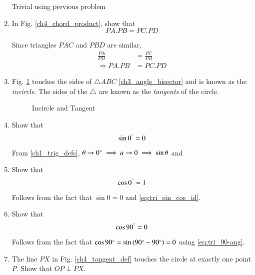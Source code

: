 \begin{enumerate}[label=\arabic*.,ref=\thesubsection.\theenumi]
\solution Trivial using previous problem
\item
	In Fig. \ref{ch4_chord_product}, show that 
	\begin{equation}
	PA.PB = PC.PD
	\end{equation}

%
\solution Since triangles $PAC$ and $PBD$ are similar, 
%
\begin{align}
\frac{PA}{PD} &= \frac{PC}{PB} \\
\Rightarrow PA.PB &= PC.PD
\end{align}
%
\item
	Fig. \ref{fig:incirc_def} touches the sides of $\triangle ABC$ \eqref{ch3_angle_bisector} and is known as  the {\em incircle}.  The sides of the $\triangle$	are known as the {\em tangents} of the circle.

\begin{figure}[!ht]
	\begin{center}
		
		\resizebox{\columnwidth}{!}{}
	\end{center}
	\caption{Incircle and Tangent}
	\label{fig:incirc_def}	
\end{figure}
%
\item
	Show that 
	\begin{equation}
	\label{ch5_sin_zero}
	\sin 0^{\degree} = 0
	\end{equation}

\solution From \eqref{ch1_trig_defs}, $\theta \to 0\degree \implies a \to 0 \implies \sin \theta $ and %
\item
	Show that 
	\begin{equation}
	\label{ch5_cos_zero}
	\cos 0^{\degree} = 1
	\end{equation}

\solution Follows from the fact that $\sin 0 = 0$ and \eqref{eq:tri_sin_cos_id}.
% 	
\item
	Show that 
	\begin{equation}
	\label{ch5_cos_90}
	\cos 90^{\degree} = 0
	\end{equation}

\solution Follows from the fact that $\cos 90 \degree = \sin \left(90\degree -90\degree\right) = 0$ using \eqref{eq:tri_90-ang}.
\item
	The line $PX$ in Fig. \ref{ch4_tangent_def} touches the circle at exactly one  point $P$. 
%
%
	Show that $OP \perp PX$.


\end{enumerate}
